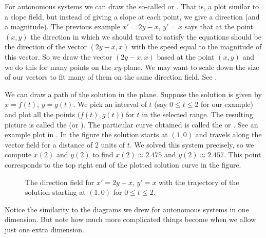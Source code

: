 \documentclass[12pt]{book}
\begin{document}
For autonomous systems we can draw the so-called
\emph{} or \emph{}.  That is,
a plot similar to a slope field, but
instead of giving a slope at each point, we give a direction (and a
magnitude).  The previous example $x' = 2y-x$, $y' = x$ says
that at the point $(x,y)$ the direction in which we should travel to satisfy
the equations should be the direction of the vector $( 2y-x, x )$
with the speed equal to the magnitude of this vector.  So we draw
the vector $(2y-x,x)$ based at the point $(x,y)$ and we do this for
many points on the $xy$-plane.  We may want to scale down the size of
our vectors to fit many of them on the same direction field.  See
.

We can draw a path of the solution in the plane.  Suppose the
solution is given by $x = f(t)$, $y=g(t)$.  We pick an interval
of $t$ (say $0 \leq t \leq 2$ for our example) and plot all the points
$\bigl(f(t),g(t)\bigr)$ for $t$ in the selected range.  The resulting picture is
called the \emph{}
(or ).
The particular curve obtained
is called the \emph{} or \emph{}.
See an example plot in .
In the figure the solution starts at $(1,0)$ and travels along the vector field
for a distance of 2 units of $t$.  We solved this system precisely, so
we compute $x(2)$ and $y(2)$ to find
$x(2) \approx 2.475$ and $y(2) \approx 2.457$.  This point corresponds
to the top right end of the plotted solution curve in the figure.

\begin{figure}[h!t]
\begin{center}
\parbox[t]{3.1in}{
 \capstart
 \caption{The direction field for $x' = 2y-x$, $y' = x$.%
 \label{sintro-vectorfield:fig}}
}
\quad
\parbox[t]{3.1in}{
 \capstart
 \caption{The direction field for $x' = 2y-x$, $y' = x$ with
 the trajectory of the solution starting at $(1,0)$
 for $0 \leq t \leq 2$.%
 \label{sintro-vectorfield-sol:fig}}
}
\end{center}
\end{figure}


Notice the similarity to the diagrams we drew for autonomous systems in one
dimension.  But note how much more complicated things become when we
allow just one extra dimension.
\end{document}
